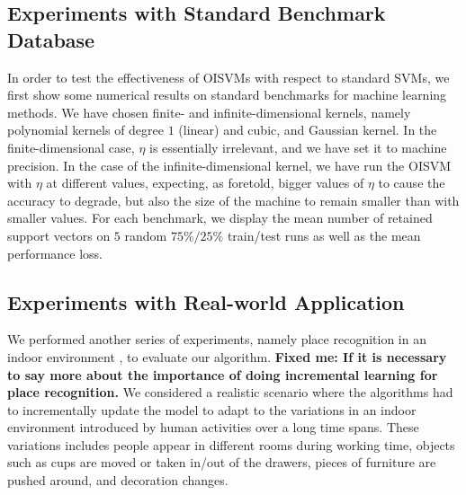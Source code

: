 \subsection*{Experiments with Standard Benchmark Database}

In order to test the effectiveness of OISVMs with respect to standard
SVMs, we first show some numerical results on standard benchmarks for machine 
learning methods. We have chosen finite- and infinite-dimensional kernels, namely
polynomial kernels of degree $1$ (linear) and cubic, and
Gaussian kernel. In the finite-dimensional case, $\eta$ is
essentially irrelevant, and we have set it to machine precision. 
In the case of the infinite-dimensional kernel, we have run the OISVM with
$\eta$ at different values, expecting, as foretold, bigger values of
$\eta$ to cause the accuracy to degrade, but also the size of the
machine to remain smaller than with smaller values.
For each benchmark, we display the mean number of retained support vectors
on $5$ random $75\%/25\%$ train/test runs as well as the mean performance loss.

\subsection*{Experiments with Real-world Application}

We performed another series of experiments, namely place recognition in an indoor
environment \cite{pronobis:iros06, luo:icra07}, to evaluate our algorithm. 
\textbf{Fixed me: If it is necessary to say more about the importance of doing incremental
learning for place recognition.}
We considered a realistic scenario
where the algorithms had to incrementally update the model to adapt to the variations
in an indoor environment introduced by human activities over a long time spans. These
variations includes people appear in different rooms during working time, objects such as
cups are moved or taken in/out of the drawers, pieces of furniture are pushed around, and
decoration changes.   

